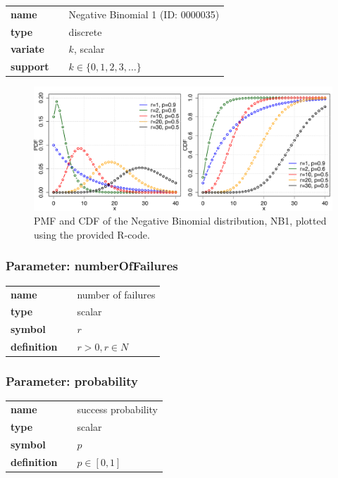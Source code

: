 \begin{tabular}{p{2cm}cl}
\textbf{name} & & Negative Binomial 1 (ID: 0000035)\\ 
 
\textbf{type} & & discrete \\ 

\textbf{variate} & & $k$, scalar \\ 

\textbf{support} & & $k \in \{0,1,2,3,\dots\}$
\end{tabular}
\begin{figure}[htb!]
\centering
  \includegraphics[width=140mm]{pics/NB1_pmf_cdf.pdf}
 \caption{PMF and CDF of the Negative Binomial distribution, NB1,
plotted using the provided R-code.}
 \label{fig:NB1pmfcdf}
\end{figure}
\subsubsection*{Parameter: numberOfFailures}

\noindent\begin{tabular}{p{2cm}cl}
\textbf{name} & & number of failures \\
\textbf{type} & & scalar \\
\textbf{symbol} & & $r$  \\
\textbf{definition} & & $r > 0, r \in N$
\end{tabular}
\subsubsection*{Parameter: probability}

\noindent\begin{tabular}{p{2cm}cl}
\textbf{name} & & success probability \\
\textbf{type} & & scalar \\
\textbf{symbol} & & $p$  \\
\textbf{definition} & & $p \in [0,1]$
\end{tabular}
